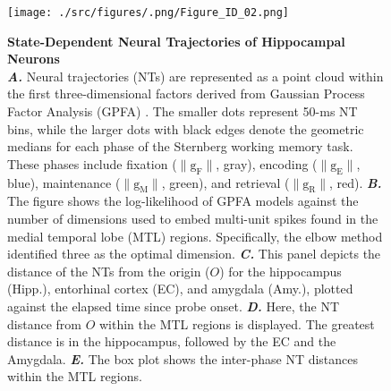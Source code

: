 \documentclass[final,3p,times,twocolumn]{elsarticle}
\begin{document}
        \clearpage
        \begin{figure}[ht]
        	\centering
            \texttt{[image: ./src/figures/.png/Figure\_ID\_02.png]}
        	\caption{\textbf{
State-Dependent Neural Trajectories of Hippocampal Neurons
}
\smallskip
\\
\textbf{\textit{A.}} Neural trajectories (NTs) are represented as a point cloud within the first three-dimensional factors derived from Gaussian Process Factor Analysis (GPFA) \cite{yu_gaussian-process_2009}. The smaller dots represent 50-ms NT bins, while the larger dots with black edges denote the geometric medians for each phase of the Sternberg working memory task. These phases include fixation ($\mathrm{\lVert g_{F} \rVert}$, gray), encoding ($\mathrm{\lVert g_{E} \rVert}$, blue), maintenance ($\mathrm{\lVert g_{M} \rVert}$, green), and retrieval ($\mathrm{\lVert g_{R} \rVert}$, red). \textbf{\textit{B.}} The figure shows the log-likelihood of GPFA models against the number of dimensions used to embed multi-unit spikes found in the medial temporal lobe (MTL) regions. Specifically, the elbow method identified three as the optimal dimension. \textbf{\textit{C.}} This panel depicts the distance of the NTs from the origin ($O$) for the hippocampus (Hipp.), entorhinal cortex (EC), and amygdala (Amy.), plotted against the elapsed time since probe onset. \textbf{\textit{D.}} Here, the NT distance from $O$ within the MTL regions is displayed. The greatest distance is in the hippocampus, followed by the EC and the Amygdala. \textbf{\textit{E.}} The box plot shows the inter-phase NT distances within the MTL regions.
}
        	\label{fig:02}
        \end{figure}
        \clearpage
\end{document}
